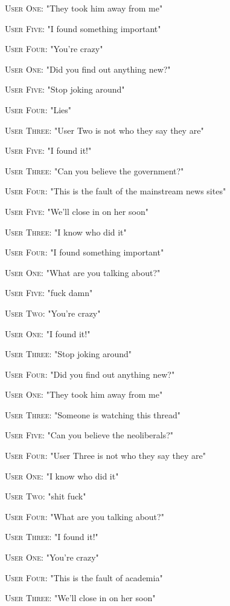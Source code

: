 \documentclass{report}
\begin{document}
\textsc{User One}: "They took him away from me" 

\textsc{User Five}: "I found something important" 

\textsc{User Four}: "You're crazy" 

\textsc{User One}: "Did you find out anything new?" 

\textsc{User Five}: "Stop joking around" 

\textsc{User Four}: "Lies" 

\textsc{User Three}: "User Two is not who they say they are" 

\textsc{User Five}: "I found it!" 

\textsc{User Three}: "Can you believe the government?" 

\textsc{User Four}: "This is the fault of the mainstream news sites" 

\textsc{User Five}: "We'll close in on her soon" 

\textsc{User Three}: "I know who did it" 

\textsc{User Four}: "I found something important" 

\textsc{User One}: "What are you talking about?" 

\textsc{User Five}: "fuck damn" 

\textsc{User Two}: "You're crazy" 

\textsc{User One}: "I found it!" 

\textsc{User Three}: "Stop joking around" 

\textsc{User Four}: "Did you find out anything new?" 

\textsc{User One}: "They took him away from me" 

\textsc{User Three}: "Someone is watching this thread" 

\textsc{User Five}: "Can you believe the neoliberals?" 

\textsc{User Four}: "User Three is not who they say they are" 

\textsc{User One}: "I know who did it" 

\textsc{User Two}: "shit fuck" 

\textsc{User Four}: "What are you talking about?" 

\textsc{User Three}: "I found it!" 

\textsc{User One}: "You're crazy" 

\textsc{User Four}: "This is the fault of academia" 

\textsc{User Three}: "We'll close in on her soon" 
\end{document}
